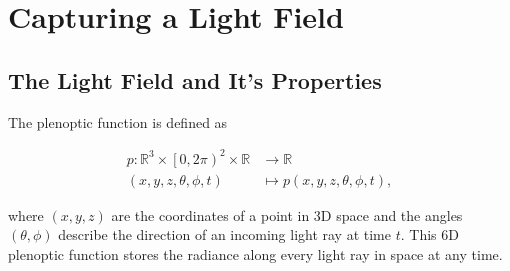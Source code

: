 \chapter{Capturing a Light Field}

\section{The Light Field and It's Properties}

The plenoptic function is defined as 

\begin{align*}
	p \colon \mathbb{R}^3 \times \left[0, 2 \pi \right)^2 \times \mathbb{R} & \to \mathbb{R} \\
	\left(x, y, z, \theta, \phi, t\right) & \mapsto p\left(x, y, z, \theta, \phi, t\right), 
\end{align*}

where $\left(x, y, z\right)$ are the coordinates of a point in 3D space and the angles $\left(\theta, \phi \right)$ describe the direction of an incoming light ray at time $t$.
This 6D plenoptic function stores the radiance along every light ray in space at any time.